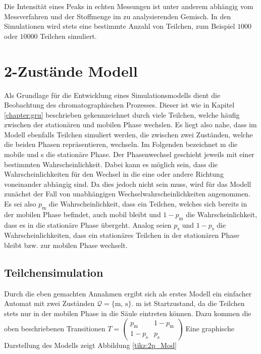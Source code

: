 Die Intensität eines Peaks in echten Messungen ist unter anderem abhängig vom Messverfahren und der Stoffmenge im zu analysierenden Gemisch. In den Simulationen wird stets eine bestimmte Anzahl von Teilchen, zum Beispiel $1000$ oder $10000$ Teilchen simuliert.


\section{2-Zustände Modell}
\label{chapter:mod:2p}

Als Grundlage für die Entwicklung eines Simulationsmodells dient die Beobachtung des chromatographischen Prozesses. Dieser ist wie in Kapitel \ref{chapter:gru} beschrieben gekennzeichnet durch viele Teilchen, welche häufig zwischen der stationären und mobilen Phase wechslen. Es liegt also nahe, dass im Modell ebenfalls Teilchen simuliert werden, die zwischen zwei Zuständen, welche die beiden Phasen repräsentieren, wechseln. Im Folgenden bezeichnet m die mobile und s die stationäre Phase. Der Phasenwechsel geschieht jeweils mit einer bestimmten Wahrscheinlichkeit. Dabei kann es möglich sein, dass die Wahrscheinlichkeiten für den Wechsel in die eine oder andere Richtung voneinander abhängig sind. Da dies jedoch nicht sein muss, wird für das Modell zunächst der Fall von unabhängigen Wechselwahrscheinlichkeiten angenommen. Es sei also $p_{\text {m}}$ die Wahrscheinlichkeit, dass ein Teilchen, welches sich bereits in der mobilen Phase befindet, auch mobil bleibt und $1-p_{\text {m}}$ die Wahrscheinlichkeit, dass es in die stationäre Phase übergeht. Analog seien $p_{\text {s}}$ und $1-p_{\text {s}}$ die Wahrscheinlichkeiten, dass ein stationäres Teilchen in der stationären Phase bleibt bzw. zur mobilen Phase wechselt. 

\subsection{Teilchensimulation}
Durch die eben gemachten Annahmen ergibt sich als erstes Modell ein einfacher Automat mit zwei Zuständen $\mathcal{Q} = \{\text{m, s}\}$. m ist Startzustand, da die Teilchen stets nur in der mobilen Phase in die Säule eintreten können. Dazu kommen die oben beschriebenen Transitionen $T= 
\begin{pmatrix}
p_{\text {m}} & 1-p_{\text {m}} \\
1-p_{\text {s}} & p_{\text {s}} 
\end{pmatrix}
$ 
Eine graphische Darstellung des Modells zeigt Abbildung \ref{tikz:2p_Mod} %

